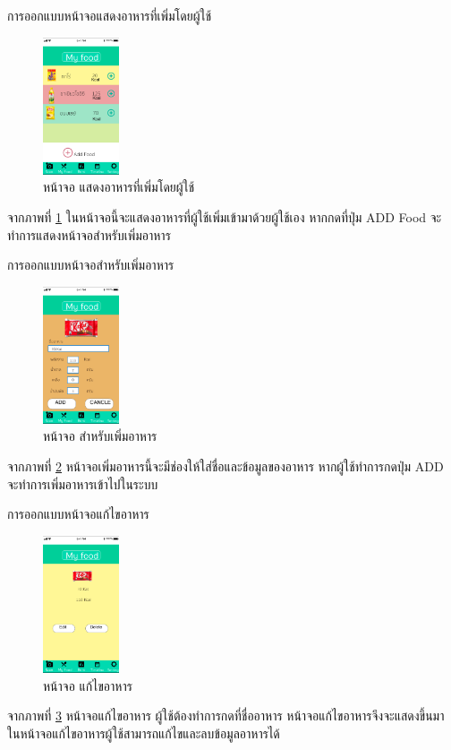 				\item การออกแบบหน้าจอแสดงอาหารที่เพิ่มโดยผู้ใช้
				\begin{figure}[H]
								\centering
								\includegraphics[width=0.2\textwidth]{Figures/3/UIDESIGN/7}
								\caption{หน้าจอ แสดงอาหารที่เพิ่มโดยผู้ใช้}
								\label{Fig:7}
							\end{figure}
							จากภาพที่ \ref{Fig:7} ในหน้าจอนี้จะแสดงอาหารที่ผู้ใช้เพิ่มเข้ามาด้วยผู้ใช้เอง หากกดที่ปุ่ม ADD Food จะทำการแสดงหน้าจอสำหรับเพิ่มอาหาร

			
							\item การออกแบบหน้าจอสำหรับเพิ่มอาหาร
							\begin{figure}[H]
											\centering
											\includegraphics[width=0.2\textwidth]{Figures/3/UIDESIGN/8.png}
											\caption{หน้าจอ สำหรับเพิ่มอาหาร }
											\label{Fig:8.png}
										\end{figure}
										จากภาพที่ \ref{Fig:8.png} หน้าจอเพิ่มอาหารนี้จะมีช่องให้ใส่ชื่อและข้อมูลของอาหาร หากผู้ใช้ทำการกดปุ่ม ADD จะทำการเพิ่มอาหารเข้าไปในระบบ

							\item การออกแบบหน้าจอแก้ไขอาหาร
							\begin{figure}[H]
											\centering
											\includegraphics[width=0.2\textwidth]{Figures/3/UIDESIGN/9.png}
											\caption{หน้าจอ แก้ไขอาหาร }
											\label{Fig:9.png}
										\end{figure}
										จากภาพที่ \ref{Fig:9.png} หน้าจอแก้ไขอาหาร ผู้ใช้ต้องทำการกดที่ชื่ออาหาร หน้าจอแก้ไขอาหารจึงจะแสดงขึ้นมา ในหน้าจอแก้ไขอาหารผู้ใช้สามารถแก้ไขและลบข้อมูลอาหารได้


